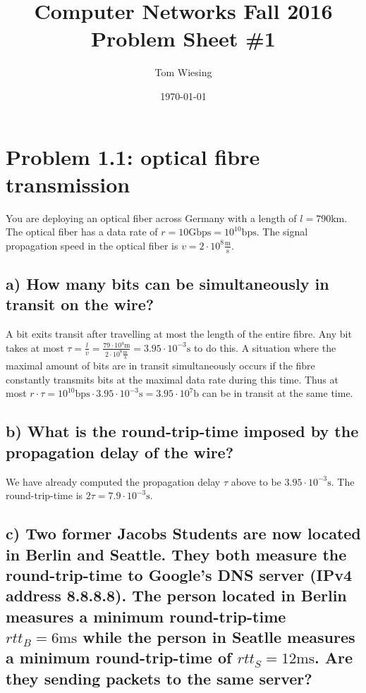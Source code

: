 \documentclass[a4paper,10pt]{article}
\title{Computer Networks Fall 2016\\Problem Sheet \#1}
\author{Tom Wiesing}
\date{\today}
\begin{document}
\maketitle

\section{Problem 1.1: optical fibre transmission}

You are deploying an optical fiber across Germany with a length of $l = 790 \mathrm{km}$. The optical fiber has a data rate of $r = 10 \mathrm{Gbps} = 10^{10} \mathrm{bps}$. The signal propagation speed in the optical fiber is $v = 2 {\cdot} 10^8 \frac{\mathrm{m}}{\mathrm{s}}$.

\subsection{a) How many bits can be simultaneously in transit on the wire?}

A bit exits transit after travelling at most the length of the entire fibre. Any bit takes at most $\tau = \frac{l}{v} = \frac{79 {\cdot} 10^4 \mathrm{m}}{2 {\cdot} 10^8 \frac{\mathrm{m}}{\mathrm{s}}} = 3.95 {\cdot} 10^{-3} \mathrm{s}$ to do this. A situation where the maximal amount of bits are in transit simultaneously occurs if the fibre constantly transmits bits at the maximal data rate during this time. Thus at most
$r {\cdot} \tau = 10^{10} \mathrm{bps} {\cdot} 3.95 {\cdot} 10^{-3} \mathrm{s} = 3.95 {\cdot} 10^7 \mathrm{b}$ can be in transit at the same time.

\subsection{b) What is the round-trip-time imposed by the propagation delay of the wire?}

We have already computed the propagation delay $\tau$ above to be $3.95 {\cdot} 10^{-3} \mathrm{s}$. The round-trip-time is $2 \tau = 7.9 {\cdot} 10^{-3} \mathrm{s}$.

\subsection{c) Two former Jacobs Students are now located in Berlin and Seattle. They both measure the round-trip-time to Google's DNS server (IPv4 address 8.8.8.8). The person located in Berlin measures a minimum round-trip-time $rtt_{B} = 6 \mathrm{ms}$ while the person in Seatlle measures  a minimum round-trip-time of $rtt_{S} = 12 \mathrm{ms}$. Are they sending packets to the same server? }
\end{document}

